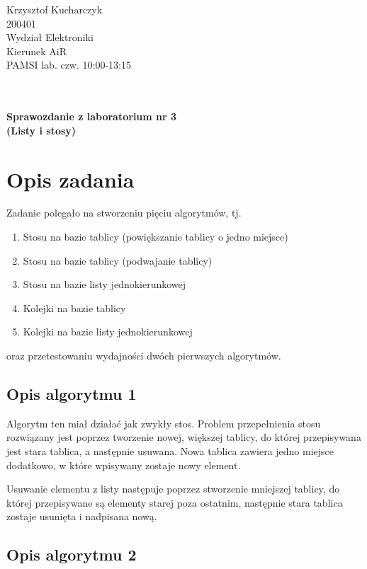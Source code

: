 \documentclass[a4paper,12pt]{article}
\begin{document}
{\raggedleft{}Krzysztof Kucharczyk}\\200401\\Wydział Elektroniki\\Kierunek AiR
\\PAMSI lab. czw. 10:00-13:15\\\\\\
\begin{center} 
	\textbf{Sprawozdanie z laboratorium nr 3\\(Listy i stosy)}
\end{center}

\section{Opis zadania}

Zadanie polegało na stworzeniu pięciu algorytmów, tj. 
\begin{enumerate} 
\item Stosu na bazie tablicy (powiększanie tablicy o jedno miejsce)
\item Stosu na bazie tablicy (podwajanie tablicy)
\item Stosu na bazie listy jednokierunkowej
\item Kolejki na bazie tablicy
\item Kolejki na bazie listy jednokierunkowej

\end{enumerate}

oraz przetestowaniu wydajności dwóch pierwszych algorytmów.

\subsection{Opis algorytmu 1}

Algorytm ten miał działać jak zwykły stos. Problem przepełnienia stosu 
rozwiązany jest poprzez tworzenie nowej, większej tablicy, do której 
przepisywana jest stara tablica, a następnie usuwana. Nowa tablica zawiera
jedno miejsce dodatkowo, w które wpisywany zostaje nowy element.

Usuwanie elementu z listy następuje poprzez stworzenie mniejszej tablicy, 
do której przepisywane są elementy starej poza ostatnim, następnie stara
tablica zostaje usunięta i nadpisana nową.

\subsection{Opis algorytmu 2}
\end{document}
